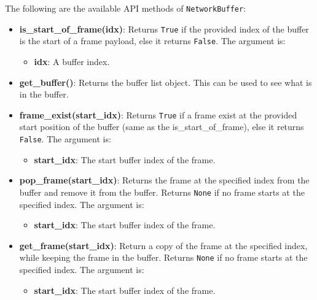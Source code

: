 \documentclass[11pt]{article}
\begin{document}
The following are the available API methods of \texttt{NetworkBuffer}:
\begin{itemize}
    \item \textbf{is\_start\_of\_frame(idx)}: Returns \texttt{True} if the provided index of the buffer is the start of a frame payload, else it returns \texttt{False}. The argument is:
    \begin{itemize}
        \item \textbf{idx}: A buffer index.
    \end{itemize}

    \item \textbf{get\_buffer()}: Returns the buffer list object. This can be used to see what is in the buffer.

    \item \textbf{frame\_exist(start\_idx)}: Returns \texttt{True} if a frame exist at the provided start position of the buffer (same as the is\_start\_of\_frame), else it returns \texttt{False}. The argument is:
    \begin{itemize}
        \item \textbf{start\_idx}: The start buffer index of the frame.
    \end{itemize}

    \item \textbf{pop\_frame(start\_idx)}: Returns the frame at the specified index from the buffer and remove it from the buffer. Returns \texttt{None} if no frame starts at the specified index. The argument is:
    \begin{itemize}
        \item \textbf{start\_idx}: The start buffer index of the frame.
    \end{itemize}

    \item \textbf{get\_frame(start\_idx)}: Return a copy of the frame at the specified index, while keeping the frame in the buffer. Returns \texttt{None} if no frame starts at the specified index. The argument is:
    \begin{itemize}
        \item \textbf{start\_idx}: The start buffer index of the frame.
    \end{itemize}


\end{itemize}
\end{document}
